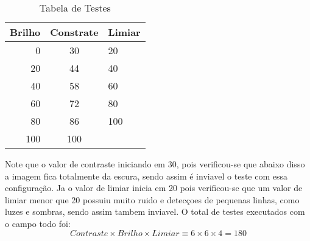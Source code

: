 \begin{table}[h]
\centering
\caption{Tabela de Testes}
\begin{tabular}{r|c|l}
Brilho & Constrate & Limiar \\ %
\hline                               %
0 & 30 &  20\\
\hline 
20 &  44 &  40\\
\hline 
40 & 58 &  60 \\
\hline 
60 &  72 &  80\\
\hline 
80 & 86  & 100\\
\hline 
100 & 100  & \\
\hline  
\end{tabular}
\end{table}
Note que o valor de contraste iniciando em 30, pois verificou-se que abaixo disso a imagem fica totalmente da escura, sendo assim é inviavel o teste com essa configuração. Ja o valor de limiar inicia em 20 pois verificou-se que um valor de limiar menor que 20 possuiu muito ruido e detecçoes de pequenas linhas, como luzes e sombras, sendo assim tambem inviavel.
O total de testes executados com o campo todo foi:
\begin{displaymath}
 Contraste \times Brilho \times Limiar \equiv 6 \times 6 \times 4 = 180
\end{displaymath}
	
	
	
	
	

